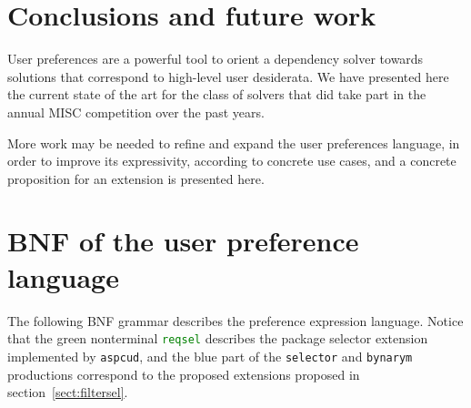 \documentclass{article}
\newcommand{\aspcudext}[1]{{\textcolor{green}{#1}}}
\begin{document}
\section{Conclusions and future work}
User preferences are a powerful tool to orient a dependency solver towards solutions that correspond
to high-level user desiderata. We have presented here the current state of the art for the class of
solvers that did take part in the annual MISC competition over the past years.

More work may be needed to refine and expand the user preferences language, in order to improve its
expressivity, according to concrete use cases, and a concrete proposition for an extension is presented
here.

\nocite{packup-2010, MCCS-2010, aspcud-2011}

%



\appendix

\section{BNF of the user preference language}

The following BNF grammar describes the preference expression language. Notice
that the green nonterminal \aspcudext{\texttt{reqsel}} describes the package
selector extension implemented by \texttt{aspcud}, and the blue part of the
\texttt{selector} and \texttt{bynarym} productions correspond to the proposed
extensions proposed in section~\ref{sect:filtersel}.
\end{document}
